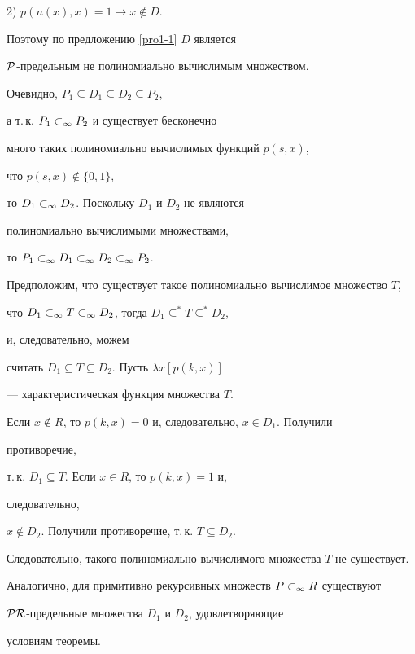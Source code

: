 \begin{pf}
2) $p(n(x),x)=1\rightarrow x\notin D$.





\noindent{}Поэтому по предложению \ref{pro1-1} $D$ является


$\cal{P}$-предельным не полиномиально вычислимым множеством.





Очевидно, $P_1\subseteq D_1\subseteq D_2\subseteq P_2$,


а т.\,к. ${P_1}\subset_\infty{P_2}$ и существует бесконечно


много таких полиномиально вычислимых функций $p(s,x)$,


что $p(s,x)\notin\{0,1\}$,


то ${D_1}\subset_\infty{D_2}$. Поскольку $D_1$ и $D_2$ не являются


полиномиально вычислимыми множествами,


то ${{P_1}\subset_\infty{D_1}}\subset_\infty{{D_2}\subset_\infty{P_2}}$.





Предположим, что существует такое полиномиально вычислимое множество $T$,


что ${D_1}\subset_\infty{{T}\subset_\infty{D_2}}$, тогда $D_1\subseteq^*T\subseteq^*D_2$,


и, следовательно, можем


считать $D_1\subseteq T\subseteq D_2$. Пусть $\lambda x[p(k,x)]$


--- характеристическая функция множества $T$.


Если $x\notin R$, то $p(k,x)=0$ и, следовательно, $x\in D_1$. Получили


противоречие,


т.\,к. $D_1\subseteq T$. Если $x\in R$, то $p(k,x)=1$ и,


следовательно, \linebreak


$x\notin D_2$. Получили противоречие, т.\,к. $T\subseteq D_2$.


Следовательно, такого полиномиально вычислимого множества $T$ не существует.





Аналогично, для примитивно рекурсивных множеств ${P}\subset_\infty{R}$ существуют


$\cal{PR}$-предельные множества $D_1$ и $D_2$, удовлетворяющие


условиям теоремы.


\end{pf}





